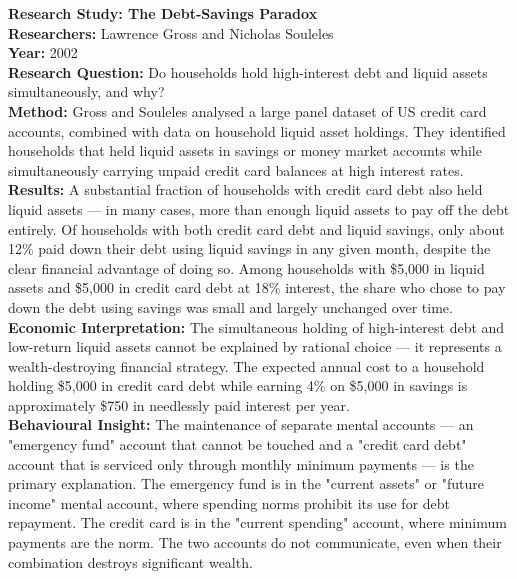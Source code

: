 \documentclass[12pt, letterpaper]{article}
\begin{document}
\begin{researchbox}
\textbf{Research Study: The Debt-Savings Paradox}\\[4pt]

\textbf{Researchers:} Lawrence Gross and Nicholas Souleles\\[4pt]
\textbf{Year:} 2002\\[4pt]
\textbf{Research Question:} Do households hold high-interest debt and liquid assets simultaneously, and why?\\[4pt]
\textbf{Method:} Gross and Souleles analysed a large panel dataset of US credit card accounts, combined with data on household liquid asset holdings. They identified households that held liquid assets in savings or money market accounts while simultaneously carrying unpaid credit card balances at high interest rates.\\[4pt]
\textbf{Results:} A substantial fraction of households with credit card debt also held liquid assets --- in many cases, more than enough liquid assets to pay off the debt entirely. Of households with both credit card debt and liquid savings, only about 12\% paid down their debt using liquid savings in any given month, despite the clear financial advantage of doing so. Among households with \$5,000 in liquid assets and \$5,000 in credit card debt at 18\% interest, the share who chose to pay down the debt using savings was small and largely unchanged over time.\\[4pt]
\textbf{Economic Interpretation:} The simultaneous holding of high-interest debt and low-return liquid assets cannot be explained by rational choice --- it represents a wealth-destroying financial strategy. The expected annual cost to a household holding \$5,000 in credit card debt while earning 4\% on \$5,000 in savings is approximately \$750 in needlessly paid interest per year.\\[4pt]
\textbf{Behavioural Insight:} The maintenance of separate mental accounts --- an "emergency fund" account that cannot be touched and a "credit card debt" account that is serviced only through monthly minimum payments --- is the primary explanation. The emergency fund is in the "current assets" or "future income" mental account, where spending norms prohibit its use for debt repayment. The credit card is in the "current spending" account, where minimum payments are the norm. The two accounts do not communicate, even when their combination destroys significant wealth.\\[4pt]
\end{researchbox}
\end{document}
